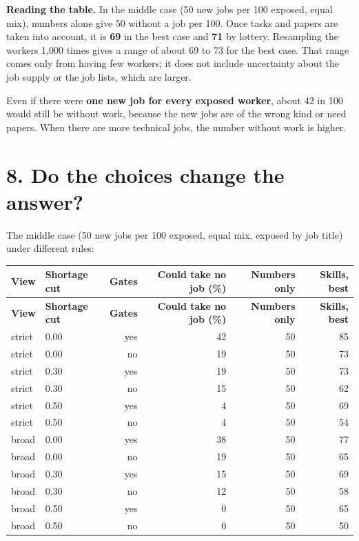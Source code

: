 \documentclass[11pt]{article}
\begin{document}
\textbf{Reading the table.} In the middle case (50 new jobs per 100 exposed, equal mix), numbers alone give 50 without a job per 100.
Once tasks and papers are taken into account, it is \textbf{69} in the best case and \textbf{71} by lottery.
Resampling the workers 1{,}000 times gives a range of about 69 to 73 for the best case. That range comes only from having few workers; it does not include uncertainty about the job supply or the job lists, which are larger.

Even if there were \textbf{one new job for every exposed worker}, about 42 in 100 would still be without work, because the new jobs are of the wrong kind or need papers.
When there are more technical jobs, the number without work is higher.

\section*{8. Do the choices change the answer?}
The middle case (50 new jobs per 100 exposed, equal mix, exposed by job title) under different rules:
{\footnotesize
\begin{longtable}{llrrrr}
\toprule
\textbf{View} & \textbf{Shortage cut} & \textbf{Gates} & \textbf{Could take no job (\%)} & \textbf{Numbers only} & \textbf{Skills, best} \\
\midrule
\endfirsthead
\toprule
\textbf{View} & \textbf{Shortage cut} & \textbf{Gates} & \textbf{Could take no job (\%)} & \textbf{Numbers only} & \textbf{Skills, best} \\
\midrule
\endhead
strict & 0.00 & yes & 42 & 50 & 85 \\
strict & 0.00 & no & 19 & 50 & 73 \\
strict & 0.30 & yes & 19 & 50 & 73 \\
strict & 0.30 & no & 15 & 50 & 62 \\
strict & 0.50 & yes & 4 & 50 & 69 \\
strict & 0.50 & no & 4 & 50 & 54 \\
broad & 0.00 & yes & 38 & 50 & 77 \\
broad & 0.00 & no & 19 & 50 & 65 \\
broad & 0.30 & yes & 15 & 50 & 69 \\
broad & 0.30 & no & 12 & 50 & 58 \\
broad & 0.50 & yes & 0 & 50 & 65 \\
broad & 0.50 & no & 0 & 50 & 50 \\
\bottomrule
\end{longtable}
}
\end{document}

